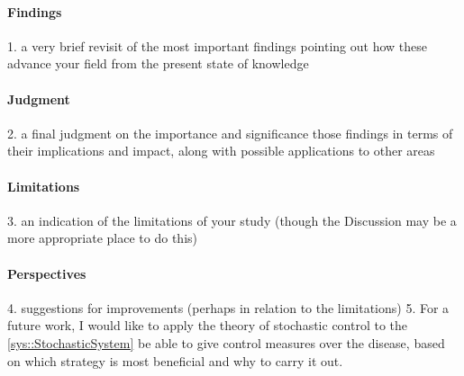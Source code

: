 
\paragraph{Findings}
1. a very brief revisit of the most important findings pointing out how these
advance your field from the present state of knowledge
\paragraph{Judgment}
2. a final judgment on the importance and significance those findings in terms of
their implications and impact, along with possible applications to other areas
\paragraph{Limitations}
3. an indication of the limitations of your study (though the Discussion may be
a more appropriate place to do this)
\paragraph{Perspectives}
4. suggestions for improvements (perhaps in relation to the limitations)
5. For a future work, I would like to apply the theory of stochastic control to the
\autoref{sys::StochasticSystem} be able to give control measures over the disease, 
based on which strategy is most beneficial and why to carry it out.

